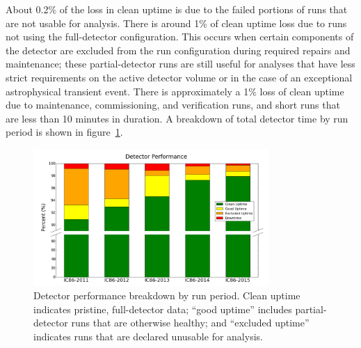 About 0.2\% of the loss in clean uptime is due to the failed portions of
runs that are not usable for analysis.  There is around 1\% of clean
uptime loss due to runs not using the full-detector configuration. This
occurs when certain components of the detector are excluded from the run
configuration during required repairs and maintenance; these
partial-detector runs are still useful for analyses that have less strict
requirements on the active detector volume or in the case of an exceptional
astrophysical transient event. There is approximately a 1\%
loss of clean uptime due to maintenance, commissioning, and verification
runs, and short runs that are less than 10 minutes in duration.  A
breakdown of total detector time by run period is shown in
figure~\ref{fig:period-performance}.  

\begin{figure}[!ht]
	\centering
    \includegraphics[width=0.8\textwidth]{graphics/uptime/bar-chart-broken-v2.pdf}
	\caption{Detector performance breakdown by
      run period.  Clean uptime indicates pristine, full-detector
      data; ``good uptime'' includes partial-detector runs that are
      otherwise healthy; and 
    ``excluded uptime'' indicates runs that are declared unusable for
      analysis.}
    \label{fig:period-performance}
\end{figure}


